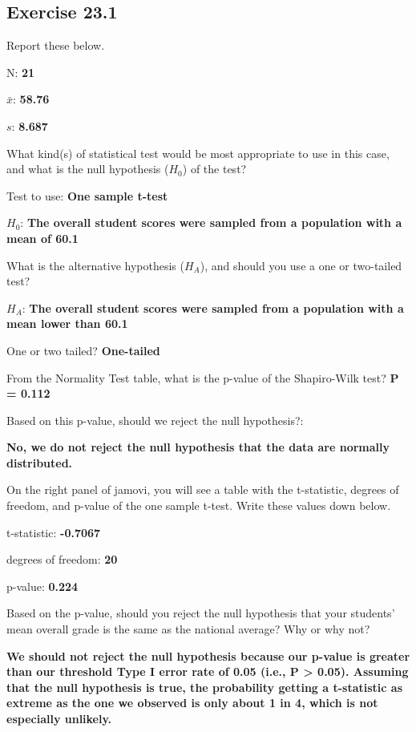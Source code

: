 \documentclass[
  openany]{scrbook}
\begin{document}
\hypertarget{exercise-23.1}{%
\subsection{Exercise 23.1}\label{exercise-23.1}}

Report these below.

N: \textbf{21}

\(\bar{x}\): \textbf{58.76}

\(s\): \textbf{8.687}

What kind(s) of statistical test would be most appropriate to use in this case, and what is the null hypothesis (\(H_{0}\)) of the test?

Test to use: \textbf{One sample t-test}

\(H_{0}\): \textbf{The overall student scores were sampled from a population with a mean of 60.1}

What is the alternative hypothesis (\(H_{A}\)), and should you use a one or two-tailed test?

\(H_{A}\): \textbf{The overall student scores were sampled from a population with a mean lower than 60.1}

One or two tailed? \textbf{One-tailed}

From the Normality Test table, what is the p-value of the Shapiro-Wilk test? \textbf{P = 0.112}

Based on this p-value, should we reject the null hypothesis?:

\textbf{No, we do not reject the null hypothesis that the data are normally distributed.}

On the right panel of jamovi, you will see a table with the t-statistic, degrees of freedom, and p-value of the one sample t-test. Write these values down below.

t-statistic: \textbf{-0.7067}

degrees of freedom: \textbf{20}

p-value: \textbf{0.224}

Based on the p-value, should you reject the null hypothesis that your students' mean overall grade is the same as the national average? Why or why not?

\textbf{We should not reject the null hypothesis because our p-value is greater than our threshold Type I error rate of 0.05 (i.e., P \textgreater{} 0.05). Assuming that the null hypothesis is true, the probability getting a t-statistic as extreme as the one we observed is only about 1 in 4, which is not especially unlikely.}
\end{document}
